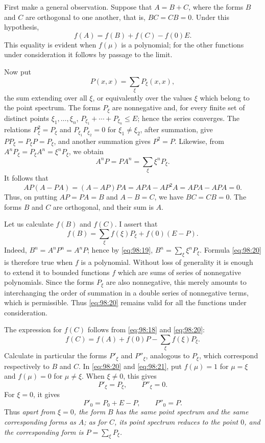 \documentclass[
  paper=b5,
  fontsize=13pt,
  twoside=true,
  open=any,
  bookmarkpackage=false,
  chapterprefix=true,
  headings=normal
]{scrbook}
\theoremstyle{definition}
\begin{document}
First make a general observation.  Suppose that \(A=B+C\), where the forms
\(B\) and \(C\) are orthogonal to one another, that is,
\(BC=CB=0\).  Under this hypothesis,
\begin{equation}
  f(A)=f(B)+f(C)-f(0)E.
  \tag{18}\label{eq:98:18}
\end{equation}
This equality is evident when \(f(\mu)\) is a polynomial; for the other
functions under consideration it follows by passage to the limit.

Now put
\[
  P(x,x)=\sum_\xi P_\xi(x,x),
\]
the sum extending over all \(\xi\), or equivalently over the values \(\xi\)
which belong to the point spectrum.  The forms \(P_\xi\) are nonnegative and,
for every finite set of distinct points \(\xi_1,\ldots,\xi_n\),
\(P_{\xi_1}+\cdots+P_{\xi_n}\le E\); hence the series converges.  The
relations \(P_\xi^2=P_\xi\) and
\(P_{\xi_1}P_{\xi_2}=0\) for \(\xi_1\ne\xi_2\), after summation, give
\(PP_\xi=P_\xi P=P_\xi\), and another summation gives \(P^2=P\).  Likewise,
from \(A^nP_\xi=P_\xi A^n=\xi^nP_\xi\), we obtain
\begin{equation}
  A^nP=PA^n=\sum_\xi \xi^nP_\xi.
  \tag{19}\label{eq:98:19}
\end{equation}
It follows that
\[
  AP(A-PA)=(A-AP)PA=APA-AP^2A=APA-APA=0.
\]
Thus, on putting \(AP=PA=B\) and \(A-B=C\), we have \(BC=CB=0\).
The forms \(B\) and \(C\) are orthogonal, and their sum is \(A\).

Let us calculate \(f(B)\) and \(f(C)\).  I assert that
\begin{equation}
  f(B)=\sum_\xi f(\xi)P_\xi+f(0)(E-P).
  \tag{20}\label{eq:98:20}
\end{equation}
Indeed, \(B^n=A^nP^n=A^nP\); hence by \eqref{eq:98:19},
\(B^n=\sum_\xi\xi^nP_\xi\).  Formula \eqref{eq:98:20} is therefore true
when \(f\) is a polynomial.  Without loss of generality it is enough to extend
it to bounded functions \(f\) which are sums of series of nonnegative
polynomials.  Since the forms \(P_\xi\) are also nonnegative, this merely
amounts to interchanging the order of summation in a double series of
nonnegative terms, which is permissible.  Thus \eqref{eq:98:20} remains valid
for all the functions under consideration.

The expression for \(f(C)\) follows from \eqref{eq:98:18} and
\eqref{eq:98:20}:
\begin{equation}
  f(C)=f(A)+f(0)P-\sum_\xi f(\xi)P_\xi.
  \tag{21}\label{eq:98:21}
\end{equation}
Calculate in particular the forms \(P'_\xi\) and \(P''_\xi\), analogous to
\(P_\xi\), which correspond respectively to \(B\) and \(C\).  In
\eqref{eq:98:20} and \eqref{eq:98:21}, put \(f(\mu)=1\) for \(\mu=\xi\)
and \(f(\mu)=0\) for \(\mu\ne\xi\).  When \(\xi\ne0\), this gives
\[
  P'_\xi=P_\xi,\qquad P''_\xi=0.
\]
For \(\xi=0\), it gives
\[
  P'_0=P_0+E-P,\qquad P''_0=P.
\]
Thus \emph{apart from \(\xi=0\), the form \(B\) has the same point spectrum
and the same corresponding forms as \(A\); as for \(C\), its point spectrum
reduces to the point \(0\), and the corresponding form is
\(P=\sum_\xi P_\xi\).}
\end{document}
